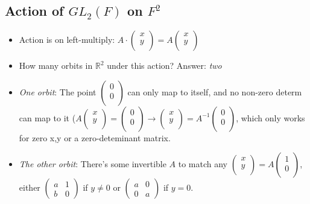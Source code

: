 \documentclass[11pt, oneside]{article}   	%
\begin{document}
\subsection{Action of $GL_2(F)$ on $F^2$}
\begin{itemize}
\item Action is on left-multiply: $A \cdot \begin{pmatrix} x \\ y \\ \end{pmatrix} = A \begin{pmatrix} x \\  y \\ \end{pmatrix}$
\item How many orbits in $\mathbb{R}^2$ under this action?   Answer: \emph{two}
\item  \emph{One orbit}: The point $\begin{pmatrix} 0 \\  0 \\ \end{pmatrix}$ can only map to itself, and no non-zero determ can map to it ($A \begin{pmatrix} x \\  y \\ \end{pmatrix} = \begin{pmatrix} 0 \\  0 \\ \end{pmatrix} \rightarrow \begin{pmatrix} x \\  y \\ \end{pmatrix} =  A^{-1} \begin{pmatrix} 0 \\  0 \\ \end{pmatrix}$, which only works for zero x,y or a zero-deteminant matrix.
\item \emph{The other orbit}: There's some invertible $A$ to match any $\begin{pmatrix} x \\  y \\ \end{pmatrix} = A \begin{pmatrix} 1 \\ 0 \\ \end{pmatrix} $, either $\begin{pmatrix} a & 1 \\ b & 0 \end{pmatrix}$ if $y \neq 0$ or $\begin{pmatrix} a & 0 \\ 0 & a\end{pmatrix}$ if $y = 0$. 

\end{itemize}
\end{document}
